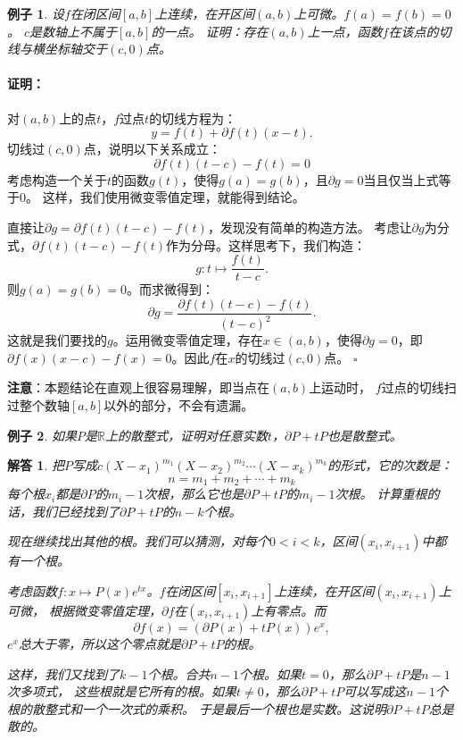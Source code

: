 \documentclass[12pt,UTF8]{ctexbook}
\newtheorem{ex}{例子}[section]
\newtheorem*{so}{解答}
\renewenvironment{proof}{\paragraph{\textbf{证明：}}}{\hfill$\square$}
\begin{document}
\begin{ex}\label{ex:3-2-4-1}
    设$f$在闭区间$[a, b]$上连续，在开区间$(a, b)$上可微。$f(a) = f(b) = 0$。
    $c$是数轴上不属于$[a, b]$的一点。
    证明：存在$(a, b)$上一点，函数$f$在该点的切线与横坐标轴交于$(c, 0)$点。
\end{ex}

\begin{proof}
    对$(a, b)$上的点$t$，$f$过点$t$的切线方程为：
    $$ y = f(t) + \partial f(t) (x - t).$$
    切线过$(c, 0)$点，说明以下关系成立：
    $$ \partial f(t) (t - c) - f(t) = 0$$
    考虑构造一个关于$t$的函数$g(t)$，使得$g(a) = g(b)$，且$\partial g = 0$当且仅当上式等于$0$。
    这样，我们使用微变零值定理，就能得到结论。

    直接让$\partial g = \partial f(t) (t - c) - f(t)$，发现没有简单的构造方法。
    考虑让$\partial g$为分式，$\partial f(t) (t - c) - f(t)$作为分母。这样思考下，我们构造：
    $$ g: t\mapsto \frac{f(t)}{t - c}.$$
    则$g(a) = g(b) = 0$。而求微得到：
    $$ \partial g = \frac{\partial f(t) (t - c) - f(t)}{(t - c)^2}.$$
    这就是我们要找的$g$。运用微变零值定理，存在$x\in(a, b)$，使得$\partial g = 0$，即
    $\partial f(x) (x - c) - f(x) = 0$。因此$f$在$x$的切线过$(c, 0)$点。
\end{proof}

\textbf{注意}：本题结论在直观上很容易理解，即当点在$(a, b)$上运动时，
$f$过点的切线扫过整个数轴$[a, b]$以外的部分，不会有遗漏。


\begin{ex}\label{ex:3-2-4-10}
    如果$P$是$\mathbb{R}$上的散整式，证明对任意实数$t$，$\partial P + tP$也是散整式。
\end{ex}

\begin{so}
    把$P$写成$c(X - x_1)^{m_1}(X - x_2)^{m_2}\cdots(X - x_k)^{m_k}$的形式，它的次数是：
    $$n = m_1 + m_2 + \cdots +m_k$$
    每个根$x_i$都是$\partial P$的$m_i - 1$次根，那么它也是$\partial P + tP$的$m_i - 1$次根。
    计算重根的话，我们已经找到了$\partial P + tP$的$n - k$个根。

    现在继续找出其他的根。我们可以猜测，对每个$0<i<k$，区间$(x_i, x_{i+1})$中都有一个根。

    考虑函数$f:x\mapsto P(x)e^{tx}$。$f$在闭区间$[x_i, x_{i+1}]$上连续，在开区间$(x_i, x_{i+1})$上可微，
    根据微变零值定理，$\partial f$在$(x_i, x_{i+1})$上有零点。而 
    $$ \partial f (x) = (\partial P(x) + tP(x))e^x,$$
    $e^x$总大于零，所以这个零点就是$\partial P + tP$的根。

    这样，我们又找到了$k-1$个根。合共$n-1$个根。如果$t=0$，那么$\partial P + tP$是$n-1$次多项式，
    这些根就是它所有的根。如果$t\neq 0$，那么$\partial P + tP$可以写成这$n-1$个根的散整式和一个一次式的乘积。
    于是最后一个根也是实数。这说明$\partial P + tP$总是散的。

\end{so}
\end{document}
